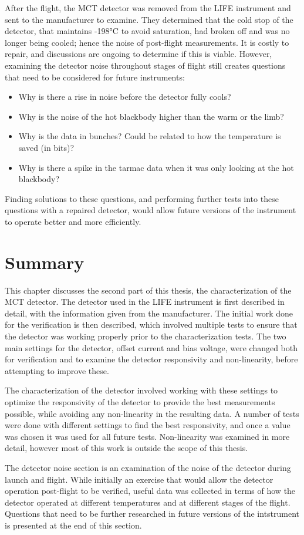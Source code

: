 After the flight, the MCT detector was removed from the LIFE instrument and sent to the manufacturer to examine. They determined that the cold stop of the detector, that maintains -198°C to avoid saturation, had broken off and was no longer being cooled; hence the noise of post-flight measurements. It is costly to repair, and discussions are ongoing to determine if this is viable. However, examining the detector noise throughout stages of flight still creates questions that need to be considered for future instruments:
\begin{itemize}
    \item Why is there a rise in noise before the detector fully cools?
    \item Why is the noise of the hot blackbody higher than the warm or the limb?
    \item Why is the data in bunches? Could be related to how the temperature is saved (in bits)?
    \item Why is there a spike in the tarmac data when it was only looking at the hot blackbody?
\end{itemize}
Finding solutions to these questions, and performing further tests into these questions with a repaired detector, would allow future versions of the instrument to operate better and more efficiently.

\section{Summary}
This chapter discusses the second part of this thesis, the characterization of the MCT detector. The detector used in the LIFE instrument is first described in detail, with the information given from the manufacturer. The initial work done for the verification is then described, which involved multiple tests to ensure that the detector was working properly prior to the characterization tests. The two main settings for the detector, offset current and bias voltage, were changed both for verification and to examine the detector responsivity and non-linearity, before attempting to improve these.

The characterization of the detector involved working with these settings to optimize the responsivity of the detector to provide the best measurements possible, while avoiding any non-linearity in the resulting data. A number of tests were done with different settings to find the best responsivity, and once a value was chosen it was used for all future tests. Non-linearity was examined in more detail, however most of this work is outside the scope of this thesis.

The detector noise section is an examination of the noise of the detector during launch and flight. While initially an exercise that would allow the detector operation post-flight to be verified, useful data was collected in terms of how the detector operated at different temperatures and at different stages of the flight. Questions that need to be further researched in future versions of the intstrument is presented at the end of this section.